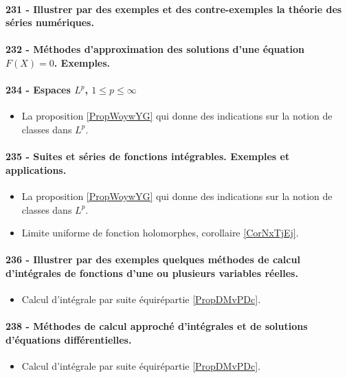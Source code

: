 \paragraph{231 - Illustrer par des exemples et des contre-exemples la théorie des séries numériques.}
\paragraph{232 - Méthodes d’approximation des solutions d’une équation $F (X ) = 0$. Exemples.}
\paragraph{234 - Espaces \( L^p\), \( 1\leq p\leq\infty\)}
\begin{itemize}
    \item La proposition \ref{PropWoywYG} qui donne des indications sur la notion de classes dans \( L^p\).
\end{itemize}
\paragraph{235 - Suites et séries de fonctions intégrables. Exemples et applications.}
\begin{itemize}
    \item La proposition \ref{PropWoywYG} qui donne des indications sur la notion de classes dans \( L^p\).
\end{itemize}
\begin{itemize}
    \item Limite uniforme de fonction holomorphes, corollaire \ref{CorNxTjEj}.
\end{itemize}
\paragraph{236 - Illustrer par des exemples quelques méthodes de calcul d’intégrales de fonctions d’une ou plusieurs variables réelles.}
\begin{itemize}
    \item Calcul d'intégrale par suite équirépartie \ref{PropDMvPDc}.
\end{itemize}

\paragraph{238 - Méthodes de calcul approché d’intégrales et de solutions d’équations différentielles.}
\begin{itemize}
    \item Calcul d'intégrale par suite équirépartie \ref{PropDMvPDc}.
\end{itemize}

